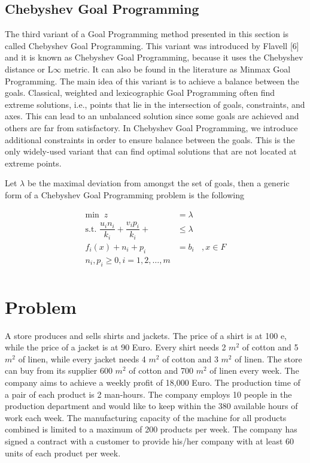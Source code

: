 \documentclass[twoside,twocolumn]{article}
\begin{document}
\subsection{Chebyshev Goal Programming}
The third variant of a Goal Programming method presented in this section is called
		Chebyshev Goal Programming. This variant was introduced by Flavell [6] and it is
		known as Chebyshev Goal Programming, because it uses the Chebyshev distance or L$\infty$ metric. It can also be found in the literature as Minmax Goal Programming. The main idea of this variant is to achieve a balance between the goals. Classical, weighted and lexicographic Goal Programming often find extreme solutions, i.e.,
		points that lie in the intersection of goals, constraints, and axes. This can lead to an unbalanced solution since some goals are achieved and others are far from satisfactory. In Chebyshev Goal Programming, we introduce additional constraints in order to ensure balance between the goals. This is the only widely-used variant that can find optimal solutions that are not located at extreme points.
		
		Let $\lambda$ be the maximal deviation from amongst the set of goals, then a generic
		form of a Chebyshev Goal Programming problem is the following
		

\begin{align}
		\text{min } ~ z &= \lambda \\
		\text{s.t. } \dfrac{u_in_i}{k_i}+\dfrac{v_ip_i}{k_i} + &\leq \lambda \\
		f_i(x)+n_i+p_i &= b_i~~~~, x\in F \\
		n_i,p_i \geq 0, i = 1,2,\dots,m \\
\end{align}

\section{Problem}
A store produces and sells shirts and jackets. The price of a shirt is at 100 e, while the price of a jacket is at 90 Euro. Every shirt needs 2 $m^2$ of cotton and 5 $m^2$ of linen, while every jacket needs 4 $m^2$ of cotton and 3 $m^2$ of linen. The store can buy from its supplier 600 $m^2$ of cotton and 700 $m^2$ of linen every week. The company aims to achieve a weekly profit of 18,000 Euro. The production time of a pair of each product is 2 man-hours. The company employs 10 people in the production department and would like to keep within the 380 available hours of work each week. The manufacturing capacity of the machine for all products combined is limited to a maximum of 200 products per week. The company has signed a contract with a customer to provide his/her company with at least 60 units of each product per week.
\end{document}
